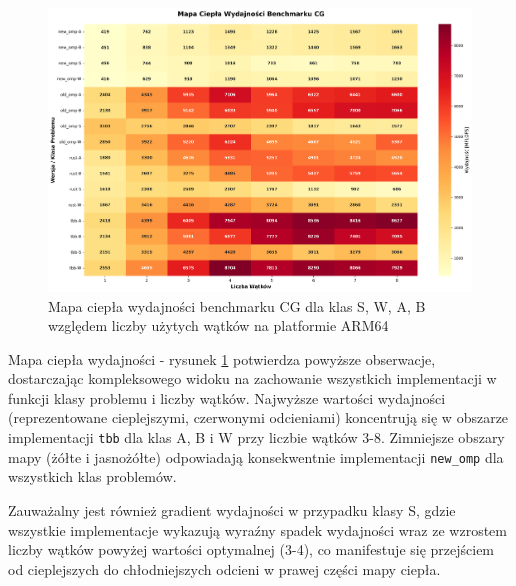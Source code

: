 \begin{figure}[H]
    \centering
    \includegraphics[width=\textwidth]{analiza/images/parallel/cg/arm/cg_mapa_ciepla_wydajnosci.png}
    \caption{Mapa ciepła wydajności benchmarku CG dla klas S, W, A, B względem liczby użytych wątków na platformie ARM64}
    \label{cg_heatmap_wydajnosci}
\end{figure}
Mapa ciepła wydajności - rysunek \ref{cg_heatmap_wydajnosci} potwierdza powyższe obserwacje, dostarczając kompleksowego widoku na zachowanie wszystkich implementacji w funkcji klasy problemu i liczby wątków. Najwyższe wartości wydajności (reprezentowane cieplejszymi, czerwonymi odcieniami) koncentrują się w obszarze implementacji \texttt{tbb} dla klas A, B i W przy liczbie wątków 3-8. Zimniejsze obszary mapy (żółte i jasnożółte) odpowiadają konsekwentnie implementacji \texttt{new\_omp} dla wszystkich klas problemów.

Zauważalny jest również gradient wydajności w przypadku klasy S, gdzie wszystkie implementacje wykazują wyraźny spadek wydajności wraz ze wzrostem liczby wątków powyżej wartości optymalnej (3-4), co manifestuje się przejściem od cieplejszych do chłodniejszych odcieni w prawej części mapy ciepła.


